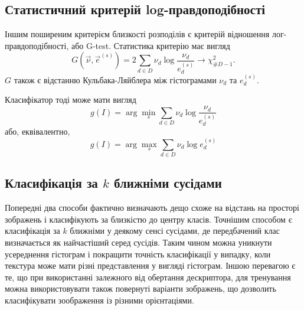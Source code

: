 \subsection{Статистичний критерій log-правдоподібності}\label{section1.3b}\hfill

Іншим поширеним критерієм близкості розподілів є критерій відношення лог-правдоподібності, або G-test.
Статистика критерію має вигляд 
\begin{equation}\label{e:gtest-1}
    G(\vec \nu,\vec e^{(s)}) = 2\sum_{d \in D} \nu_d \log \frac{\nu_d}{e^{(s)}_d} \longrightarrow \chi^2_{\# D - 1}.
\end{equation}
$G$ також є відстанню Кульбака-Ляйблера між гістограмами $\nu_d$ та $e^{(s)}_d$. 


Класифікатор тоді може мати вигляд
\begin{equation}\label{e:gtest-classifier-1}
    g(I) = \arg \min_s  \sum_{d \in D} \nu_d \log \frac{\nu_d}{e^{(s)}_d}
\end{equation}
або, еквівалентно,\begin{equation*}\label{e:gtest-classifier-2}
    g(I) = \arg \max_s  \sum_{d \in D} \nu_d \log e^{(s)}_d
\end{equation*}

\subsection{Класифікація за $k$ ближніми сусідами}\label{section1.3c}

Попередні два способи фактично визначають дещо схоже на відстань на просторі зображень і класифікують за близкістю до центру класів.
Точнішим способом є класифікація за $k$ ближніми у деякому сенсі сусідами, де передбачений клас визначається як найчастіший серед сусідів.
Таким чином можна уникнути усереднення гістограм і покращити точність класифікації у випадку, коли текстура може мати різні представлення у вигляді гістограм.
Іншою перевагою є те, що при використанні залежного від обертання дескриптора, для тренування можна використовувати також повернуті варіанти зображень, що дозволить класифікувати зоображення із різними орієнтаціями.



